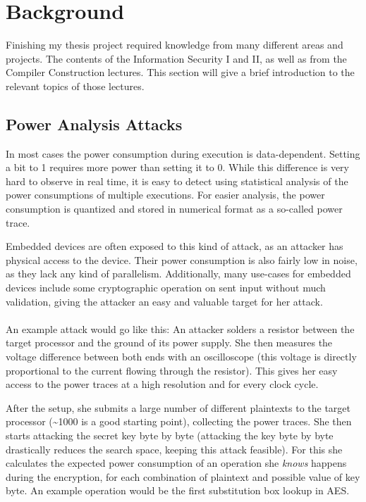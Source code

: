 \section{Background}
\label{background}
Finishing my thesis project required knowledge from many different areas and projects.
The contents of the Information Security I and II, as well as from the Compiler Construction lectures.
This section will give a brief introduction to the relevant topics of those lectures.

\subsection{Power Analysis Attacks}
In most cases the power consumption during execution is data-dependent.
Setting a bit to 1 requires more power than setting it to 0.
While this difference is very hard to observe in real time, it is easy to detect using statistical analysis of the power consumptions of multiple executions.
For easier analysis, the power consumption is quantized and stored in numerical format as a so-called power trace.

Embedded devices are often exposed to this kind of attack, as an attacker has physical access to the device.
Their power consumption is also fairly low in noise, as they lack any kind of parallelism.
Additionally, many use-cases for embedded devices include some cryptographic operation on sent input without much validation, giving the attacker an easy and valuable target for her attack.
\\
\\
An example attack would go like this:
An attacker solders a resistor between the target processor and the ground of its power supply.
She then measures the voltage difference between both ends with an oscilloscope (this voltage is directly proportional to the current flowing through the resistor).
This gives her easy access to the power traces at a high resolution and for every clock cycle.

After the setup, she submits a large number of different plaintexts to the target processor (\textasciitilde 1000 is a good starting point), collecting the power traces.
She then starts attacking the secret key byte by byte (attacking the key byte by byte drastically reduces the search space, keeping this attack feasible).
For this she calculates the expected power consumption of an operation she \emph{knows} happens during the encryption, for each combination of plaintext and possible value of key byte.
An example operation would be the first substitution box lookup in AES.

